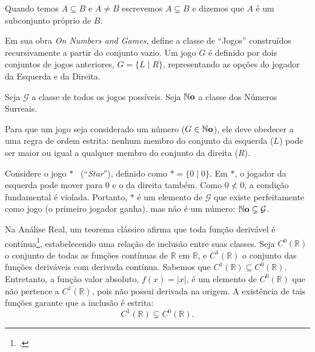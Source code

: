 \begin{definicao}
    \label{def:subconjunto_proprio}
    Quando temos \(A \subseteq B\) e \(A \neq B\) escrevemos \(A \subsetneq B\) e dizemos que \(A\) é um subconjunto próprio de \(B\).
\end{definicao}

\begin{exemplo}
    \label{ex:construcao_subconjunto_propriedade}
    Em sua obra \emph{On Numbers and Games}, \textcite{conway2001} define a classe de ``Jogos'' construídos recursivamente a partir do conjunto vazio.
    Um jogo \( G \) é definido por dois conjuntos de jogos anteriores, \( G = \{ L \mid R \} \), representando as opções do jogador da Esquerda e da Direita.

    Seja \( \mathcal{G} \) a classe de todos os jogos possíveis.
    Seja \( \mathbb{N}\mathbf{o} \) a classe dos Números Surreais.

    Para que um jogo seja considerado um número (\( G \in \mathbb{N}\mathbf{o} \)), ele deve obedecer a uma regra de ordem estrita: nenhum membro do conjunto da esquerda (\( L \)) pode ser maior ou igual a qualquer membro do conjunto da direita (\( R \)).

    Considere o jogo \( * \) \ (``\emph{Star}''), definido como \( * = \{ 0 \mid 0 \} \).
    Em \( * \), o jogador da esquerda pode mover para 0 e o da direita também. Como \( 0 \not< 0 \), a condição fundamental é violada.
    Portanto, \( * \) é um elemento de \( \mathcal{G} \) que existe perfeitamente como jogo (o primeiro jogador ganha), mas não é um número: \( \mathbb{N}\mathbf{o} \subsetneq \mathcal{G} \).
\end{exemplo}

\begin{exemplo}
    Na Análise Real, um teorema clássico afirma que toda função derivável é contínua\footcite[p.~89]{lima2006}, estabelecendo uma relação de inclusão entre suas classes.
    Seja \(C^0(\mathbb{R})\) o conjunto de todas as funções contínuas de \(\mathbb{R}\) em \(\mathbb{R}\), e \(C^1(\mathbb{R})\) o conjunto das funções deriváveis com derivada contínua.
    Sabemos que \(C^1(\mathbb{R}) \subseteq C^0(\mathbb{R})\).
    Entretanto, a função valor absoluto, \(f(x) = |x|\), é um elemento de \(C^0(\mathbb{R})\) que não pertence a \(C^1(\mathbb{R})\), pois não possui derivada na origem.
    A existência de tais funções garante que a inclusão é estrita:
    \[
        C^1(\mathbb{R}) \subsetneq C^0(\mathbb{R}).
    \]
\end{exemplo}

